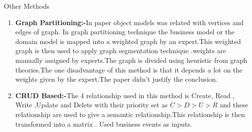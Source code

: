 \documentclass{beamer}
\begin{document}
\begin{frame}{Other Methods}
	\begin{enumerate}
		\item \textbf{Graph Partitioning:-}In paper \cite{graphPartion} object models was related with vertices and edges of graph.
		In graph partitioning technique the business model or the domain model is mapped into a weighted graph by an expert.This weighted graph is then used to apply graph segmentation technique .weights are manually assigned by experts.The graph is divided using heuristic from graph theories.The one disadvantage of this method is that it depends a lot on the weights given by the expert.The paper didn't justify the conclusion.
		\item \textbf{CRUD Based:-}The 4 relationship used in this method is Create, Read , Write ,Update and Delete with their priority set as $C > D > U > R$ and these relationship are used to give a semantic relationship.This relationship is then transformed into a matrix .\cite{CRUD} Used business events as inputs.
	\end{enumerate}
\end{frame}
\end{document}
